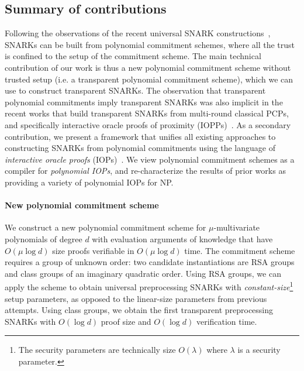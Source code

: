 \subsection{Summary of contributions} 
Following the observations of the recent universal SNARK constructions~\cite{Plonk,Sonic,Libra}, SNARKs can be built from polynomial commitment schemes, where all the trust is confined to the setup of the commitment scheme. The main technical contribution of our work is thus a new polynomial commitment scheme without trusted setup (i.e. a transparent polynomial commitment scheme), which we can use to construct transparent SNARKs. The observation that transparent polynomial commitments imply transparent SNARKs was also implicit in the recent works that build transparent SNARKs from multi-round classical PCPs, and specifically interactive oracle proofs of proximity (IOPPs)~\cite{ICALP:BBHR18}. As a secondary contribution, we present a framework that unifies all existing approaches to constructing SNARKs from polynomial commitments using the language of \emph{interactive oracle proofs} (IOPs)~\cite{STOC:ReiRotRot16,TCC:BenChiSpo16}. We view polynomial commitment schemes as a compiler for \emph{polynomial IOPs}, and re-characterize the results of prior works as providing a variety of polynomial IOPs for NP. 

\paragraph{New polynomial commitment scheme} We construct a new polynomial commitment scheme for $\mu$-multivariate polynomials of degree $d$ with evaluation arguments of knowledge that have $O(\mu \log d)$ size proofs verifiable in $O(\mu \log d)$ time. The commitment scheme requires a group of unknown order: two candidate instantiations are RSA groups and class groups of an imaginary quadratic order. Using RSA groups, we can apply the scheme to obtain universal preprocessing SNARKs with \emph{constant-size}\footnote{The security parameters are technically size $O(\lambda)$ where $\lambda$ is a security parameter.} setup parameters, as opposed to the linear-size parameters from previous attempts. Using class groups, we obtain the first transparent preprocessing SNARKs with $O(\log d)$ proof size and $O(\log d)$ verification time. %

